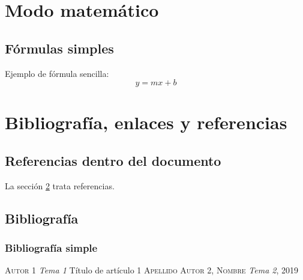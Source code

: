 \documentclass{article}
\begin{document}
\section{Modo matemático}
\subsection{Fórmulas simples}
Ejemplo de fórmula sencilla:
\[
y=mx+b
\]
\newpage
\section{Bibliografía, enlaces y referencias} \label{sec:Seccion 1}
\subsection{Referencias dentro del documento} 
\begin{flushleft}
La sección \ref{sec:Seccion 1} trata referencias.
\end{flushleft}
\subsection{Bibliografía}
\subsubsection{Bibliografía simple}
\begin{thebibliography}{}
\textsc{Autor 1}
\textit{Tema 1} Título de artículo 1
\textsc{Apellido Autor 2, Nombre}
\textit{Tema 2}, 2019
\end{thebibliography}
\end{document}

